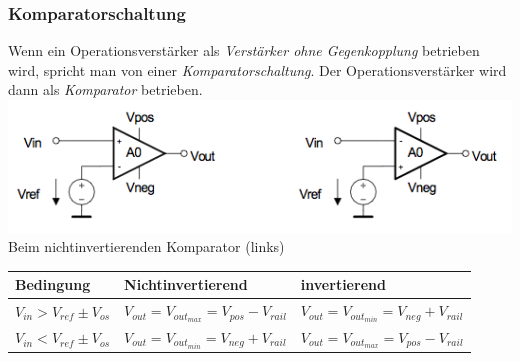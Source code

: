 		\subsubsection{Komparatorschaltung}
			\begin{minipage}{18cm}
            	Wenn ein Operationsverstärker als {\it Verstärker ohne
            	Gegenkopplung} betrieben wird, spricht man von einer {\it
            	Komparatorschaltung}. Der Operationsverstärker wird dann als {\it
            	Komparator} betrieben.\\
            	\includegraphics[width=16cm]{./images/komparator.png}\\
            	Beim nichtinvertierenden Komparator (links)\\
            	\begin{tabular}{|l|l|l|} \hline
            		Bedingung & Nichtinvertierend & invertierend \\ \hline
            		$V_{in} > V_{ref} \pm V_{os}$	
            		& $V_{out} = V_{out_{max}} = V_{pos}-V_{rail}$ 
            		& $V_{out} = V_{out_{min}} = V_{neg}+V_{rail}$\\ \hline
            		$V_{in} < V_{ref} \pm V_{os}$
            		& $V_{out} = V_{out_{min}} = V_{neg}+V_{rail}$ 
            		& $V_{out} = V_{out_{max}} = V_{pos}-V_{rail}$ \\ \hline
            	\end{tabular}
            \end{minipage}

